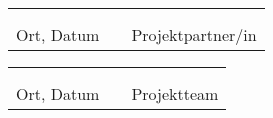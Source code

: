 \vspace*{1cm}

\hspace*{\fill}\begin{tabular}{cp{2em}c} 
   \hspace{4cm}        & & \hspace{6cm} \\\cline{1-1}\cline{3-3}
                       & & \\[-3mm]
   {\footnotesize Ort, Datum }  & & {\footnotesize Projektpartner/in }
\end{tabular}\hspace*{\fill}

\vspace*{1cm}

\hspace*{\fill}\begin{tabular}{cp{2em}c} 
   \hspace{4cm}        & & \hspace{6cm} \\\cline{1-1}\cline{3-3}
                       & & \\[-3mm]
   {\footnotesize Ort, Datum }  & & {\footnotesize Projektteam }
\end{tabular}\hspace*{\fill}
